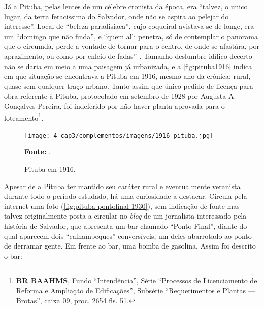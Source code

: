 Já a Pituba, pelas lentes de um célebre cronista da época, era ``talvez, o unico lugar, da terra feracissima do Salvador, onde não se aspira ao pelejar do interesse''. Local de ``beleza paradisiaca'', cujo coqueiral avistava-se de longe, era um ``domingo que não finda'', e ``quem alli penetra, só de contemplar o panorama que o circumda, perde a vontade de tornar para o centro, de onde se afastára, por aprazimento, ou como por enleio de fadas'' \cite{campos_pituba_1916}. Tamanho deslumbre idílico decerto não se daria em meio a uma paisagem já urbanizada, e a \autoref{fig:pituba1916} indica em que situação se encontrava a Pituba em 1916, mesmo ano da crônica: rural, quase sem qualquer traço urbano. Tanto assim que único pedido de licença para obra referente à Pituba, protocolado em setembro de 1928 por Augusta A. Gonçalves Pereira, foi indeferido por não haver planta aprovada para o loteamento\footnote{\textbf{BR BAAHMS}, Fundo ``Intendência'', Série ``Processos de Licenciamento de Reforma e Ampliação de Edificações'', Subsérie ``Requerimentos e Plantas --- Brotas'', caixa 09, proc. 2654 fls. 51.}.

\begin{figure}[!htp]
\centering
\caption{Pituba em 1916.}
\texttt{[image: 4-cap3/complementos/imagens/1916-pituba.jpg]}{\par \footnotesize \textbf{Fonte:} .}
\label{fig:pituba1916}
\end{figure}

Apesar de a Pituba ter mantido seu caráter rural e eventualmente veranista durante todo o período estudado, há uma curiosidade a destacar. Circula pela internet uma foto (\autoref{fig:pituba-pontofinal-1930}), sem indicação de fonte mas talvez originalmente posta a circular no \textit{blog} de um jornalista interessado pela história de Salvador, que apresenta um bar chamado ``Ponto Final'', diante do qual aparecem dois ``calhambeques'' conversíveis, um deles abarrotado ao ponto de derramar gente. Em frente ao bar, uma bomba de gasolina. Assim foi descrito o bar:

